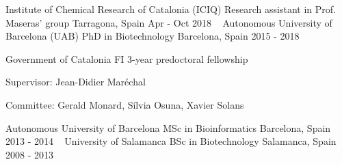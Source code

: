 


\begin{cventries}
  \cventry
    {Institute of Chemical Research of Catalonia (ICIQ)} %
    {Research assistant in Prof. Maseras' group} %
    {Tarragona, Spain} %
    {Apr - Oct 2018} %
    {~}
  \cventry
    {Autonomous University of Barcelona (UAB)} %
    {PhD in Biotechnology} %
    {Barcelona, Spain} %
    {2015 - 2018} %
    {
      \begin{cvitems} %
        \item {Government of Catalonia FI 3-year predoctoral fellowship}
        \item {Supervisor: Jean-Didier Maréchal}
        \item {Committee: Gerald Monard, Sílvia Osuna, Xavier Solans\\}
      \end{cvitems}
    }
  \cventry
    {Autonomous University of Barcelona} %
    {MSc in Bioinformatics} %
    {Barcelona, Spain} %
    {2013 - 2014} %
    {~}
  \cventry
    {University of Salamanca} %
    {BSc in Biotechnology} %
    {Salamanca, Spain} %
    {2008 - 2013} %
    {~}

\end{cventries}
